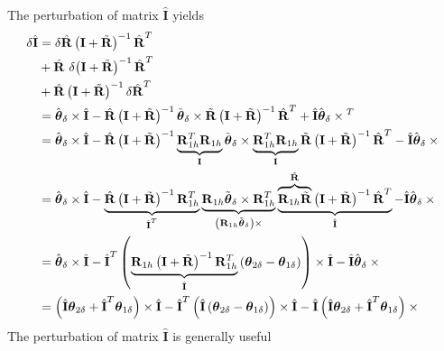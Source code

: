 \documentclass[10pt,dvips,fleqn,subeqn]{report}
\newcommand{\T}[1]{\bm{\mathbf{#1}}}
\newcommand{\TT}[1]{\bm{\mathbf{#1}}}
\begin{document}
The perturbation of matrix $\hat{\TT{I}}$ yields
\begin{subequations}
\begin{align}
	\delta\hat{\T{I}}
	&= \delta\hat{\T{R}} \plbr{\T{I} + \tilde{\T{R}}}^{-1} \hat{\T{R}}^T
	\nonumber \\
	& \mbox{}
	+ \hat{\T{R}} \ \delta\! \plbr{\T{I} + \tilde{\T{R}}}^{-1} \hat{\T{R}}^T
	\nonumber \\
	& \mbox{}
	+ \hat{\T{R}} \plbr{\T{I} + \tilde{\T{R}}}^{-1} \delta\hat{\T{R}}^T \\
	&= \hat{\T{\theta}}_{\delta}\times\hat{\TT{I}}
		- \hat{\TT{R}} \plbr{\TT{I} + \tilde{\TT{R}}}^{-1}
			\tilde{\T{\theta}}_{\delta}\times\tilde{\TT{R}}
			\plbr{\TT{I} + \tilde{\TT{R}}}^{-1} \hat{\TT{R}}^T
		+ \hat{\TT{I}} \hat{\T{\theta}}_{\delta}\times{}^T
	\nonumber \\
	&= \hat{\T{\theta}}_{\delta}\times\hat{\TT{I}}
	- \hat{\TT{R}} \plbr{\TT{I} + \tilde{\TT{R}}}^{-1}
		\underbrace{\TT{R}_{1h}^T \TT{R}_{1h}}_{\TT{I}}
		\tilde{\T{\theta}}_{\delta}\times \underbrace{\TT{R}_{1h}^T \TT{R}_{1h}}_{\TT{I}} \tilde{\TT{R}} 
		\plbr{\TT{I} + \tilde{\TT{R}}}^{-1} \hat{\TT{R}}^T
	- \hat{\TT{I}} \hat{\T{\theta}}_{\delta}\times{}
	\nonumber \\
	&= \hat{\T{\theta}}_{\delta}\times\hat{\TT{I}}
	- \underbrace{\hat{\TT{R}} \plbr{\TT{I} + \tilde{\TT{R}}}^{-1} \TT{R}_{1h}^T}_{\hat{\TT{I}}^T}
		\underbrace{
			\TT{R}_{1h} \tilde{\T{\theta}}_{\delta}\times \TT{R}_{1h}^T
		}_{\plbr{\TT{R}_{1h} \tilde{\T{\theta}}_{\delta}}\times{}}
		\underbrace{
			\overbrace{\TT{R}_{1h} \tilde{\TT{R}}}^{\hat{\TT{R}}} \plbr{\TT{I} + \tilde{\TT{R}}}^{-1} \hat{\TT{R}}^T
		}_{\hat{\TT{I}}}
	- \hat{\TT{I}} \hat{\T{\theta}}_{\delta}\times{}
	\nonumber \\
	&= \hat{\T{\theta}}_{\delta}\times\hat{\TT{I}}
	- \hat{\TT{I}}^T \plbr{
		\underbrace{
			\TT{R}_{1h}\plbr{\TT{I} + \tilde{\TT{R}}}^{-1}\TT{R}_{1h}^T
		}_{\hat{\TT{I}}} \plbr{\T{\theta}_{2\delta} - \T{\theta}_{1\delta}}
	}\times \hat{\TT{I}}
	- \hat{\TT{I}} \hat{\T{\theta}}_{\delta}\times{}
	\nonumber \\
	&= \plbr{\hat{\TT{I}}\T{\theta}_{2\delta} + \hat{\TT{I}}^T\T{\theta}_{1\delta}}\times\hat{\TT{I}}
	- \hat{\TT{I}}^T \plbr{\hat{\TT{I}}\plbr{\T{\theta}_{2\delta} - \T{\theta}_{1\delta}}}\times \hat{\TT{I}}
	- \hat{\TT{I}}\plbr{\hat{\TT{I}}\T{\theta}_{2\delta} + \hat{\TT{I}}^T\T{\theta}_{1\delta}}\times{}
\end{align}
\end{subequations}
The perturbation of matrix $\hat{\T{I}}$ is generally useful
\end{document}
